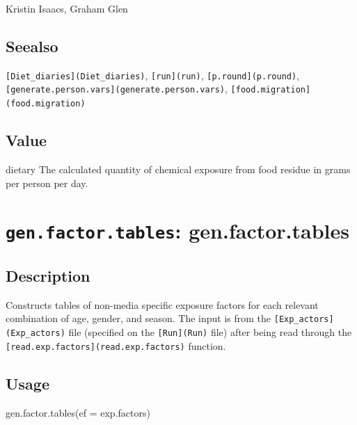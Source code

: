 \documentclass[
]{article}
\newenvironment{Shaded}{\begin{snugshade}}{\end{snugshade}}
\newcommand{\AttributeTok}[1]{\textcolor[rgb]{0.77,0.63,0.00}{#1}}
\newcommand{\FunctionTok}[1]{\textcolor[rgb]{0.00,0.00,0.00}{#1}}
\newcommand{\NormalTok}[1]{#1}
\begin{document}
Kristin Isaacs, Graham Glen

\hypertarget{seealso-13}{%
\subsection{Seealso}\label{seealso-13}}

\texttt{{[}Diet\_diaries{]}(Diet\_diaries)}, \texttt{{[}run{]}(run)},
\texttt{{[}p.round{]}(p.round)},
\texttt{{[}generate.person.vars{]}(generate.person.vars)},
\texttt{{[}food.migration{]}(food.migration)}

\hypertarget{value-18}{%
\subsection{Value}\label{value-18}}

dietary The calculated quantity of chemical exposure from food residue
in grams per person per day.

\hypertarget{gen.factor.tables-gen.factor.tables}{%
\section{\texorpdfstring{\texttt{gen.factor.tables}:
gen.factor.tables}{gen.factor.tables: gen.factor.tables}}\label{gen.factor.tables-gen.factor.tables}}

\hypertarget{description-24}{%
\subsection{Description}\label{description-24}}

Constructs tables of non-media specific exposure factors for each
relevant combination of age, gender, and season. The input is from the
\texttt{{[}Exp\_actors{]}(Exp\_actors)} file (specified on the
\texttt{{[}Run{]}(Run)} file) after being read through the
\texttt{{[}read.exp.factors{]}(read.exp.factors)} function.

\hypertarget{usage-24}{%
\subsection{Usage}\label{usage-24}}

\begin{Shaded}
\begin{Highlighting}[]
\FunctionTok{gen.factor.tables}\NormalTok{(}\AttributeTok{ef =}\NormalTok{ exp.factors)}
\end{Highlighting}
\end{Shaded}
\end{document}

